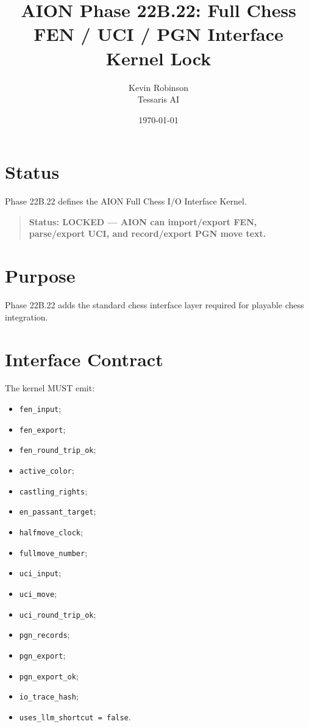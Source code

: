 \documentclass[11pt,a4paper]{article}
\title{\textbf{AION Phase 22B.22: Full Chess FEN / UCI / PGN Interface Kernel Lock}}
\author{Kevin Robinson\\Tessaris AI}
\date{\today}
\begin{document}
\maketitle

\section{Status}

Phase 22B.22 defines the AION Full Chess I/O Interface Kernel.

\begin{quote}
\textbf{Status: LOCKED --- AION can import/export FEN, parse/export UCI, and record/export PGN move text.}
\end{quote}

\section{Purpose}

Phase 22B.22 adds the standard chess interface layer required for playable chess integration.

\section{Interface Contract}

The kernel MUST emit:

\begin{itemize}
  \item \texttt{fen\_input};
  \item \texttt{fen\_export};
  \item \texttt{fen\_round\_trip\_ok};
  \item \texttt{active\_color};
  \item \texttt{castling\_rights};
  \item \texttt{en\_passant\_target};
  \item \texttt{halfmove\_clock};
  \item \texttt{fullmove\_number};
  \item \texttt{uci\_input};
  \item \texttt{uci\_move};
  \item \texttt{uci\_round\_trip\_ok};
  \item \texttt{pgn\_records};
  \item \texttt{pgn\_export};
  \item \texttt{pgn\_export\_ok};
  \item \texttt{io\_trace\_hash};
  \item \texttt{uses\_llm\_shortcut = false}.
\end{itemize}
\end{document}
